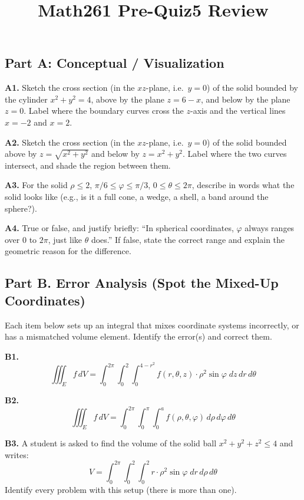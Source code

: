 \documentclass[11pt]{article}
\title{\textbf{Math261 Pre-Quiz5 Review}}
\author{}
\date{}
\begin{document}
\maketitle

\subsection*{\textbf{Part A}: Conceptual / Visualization}

\textbf{A1.} Sketch the cross section (in the $xz$-plane, i.e.\ $y=0$) of the solid bounded by the cylinder $x^2+y^2=4$, above by the plane $z=6-x$, and below by the plane $z=0$. Label where the boundary curves cross the $z$-axis and the vertical lines $x=-2$ and $x=2$.

\textbf{A2.} Sketch the cross section (in the $xz$-plane, i.e.\ $y=0$) of the solid bounded above by $z=\sqrt{x^2+y^2}$ and below by $z=x^2+y^2$. Label where the two curves intersect, and shade the region between them.

\textbf{A3.} For the solid $\rho \leq 2$, $\pi/6 \leq \varphi \leq \pi/3$, $0\leq\theta\leq 2\pi$, describe in words what the solid looks like (e.g., is it a full cone, a wedge, a shell, a band around the sphere?).

\textbf{A4.} True or false, and justify briefly: ``In spherical coordinates, $\varphi$ always ranges over $0$ to $2\pi$, just like $\theta$ does.'' If false, state the correct range and explain the geometric reason for the difference.

\subsection*{\textbf{Part B}. Error Analysis (Spot the Mixed-Up Coordinates)}

Each item below sets up an integral that mixes coordinate systems incorrectly, or has a mismatched volume element. Identify the error(s) and correct them.

\textbf{B1.}
\[
\iiint_E f\, dV = \int_0^{2\pi}\int_0^2\int_0^{4-r^2} f(r,\theta,z)\cdot \rho^2\sin\varphi\; dz\, dr\, d\theta
\]

\textbf{B2.}
\[
\iiint_E f\, dV = \int_0^{2\pi}\int_0^\pi\int_0^a f(\rho,\theta,\varphi)\, d\rho\, d\varphi\, d\theta
\]

\textbf{B3.} A student is asked to find the volume of the solid ball $x^2+y^2+z^2\leq 4$ and writes:
\[
V = \int_0^{2\pi}\int_0^2\int_0^2 r\cdot \rho^2\sin\varphi\; dr\, d\rho\, d\theta
\]
Identify every problem with this setup (there is more than one).
\end{document}
